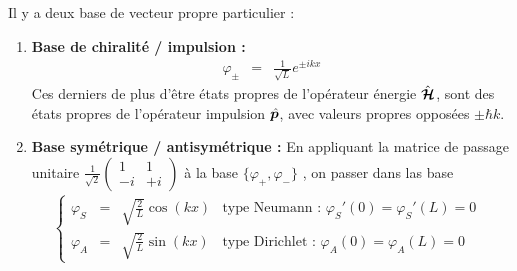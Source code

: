 \medskip
Il y a deux base de vecteur propre particulier : 
\begin{enumerate}[label=\roman*)]
	\item {\bf Base de chiralité / impulsion :}
	\begin{eqnarray}\label{chap.1.rapel.libre.7}
		\varphi_\pm  & = & \displaystyle \frac{1}{\sqrt{L}} e^{\pm ikx} 
	\end{eqnarray}
	Ces derniers de plus d'être états propres de l’opérateur énergie $\hat{\bm{\mathcal{H}}}$, sont des états propres de l’opérateur impulsion $\hat{\bm{p}}$, avec valeurs propres opposées $\pm \hbar k$.
	\item {\bf Base symétrique / antisymétrique :} En appliquant la matrice de passage unitaire  $\frac{1}{\sqrt{2}}\left (\begin{matrix}1 & 1 \\ -i & + i\end{matrix}\right)$ à la base $\{ \varphi_+ , \varphi_- \}$ , on passer dans las base    
	\begin{eqnarray}\label{chap.1.rapel.libre.8}
		\left \{ \begin{array}{rcllll} \varphi_S  & = & \displaystyle \sqrt{\frac{2}{L}} \cos (kx)  & \mbox{type Neumann  : $\varphi_S'(0) = \varphi_S'(L) = 0 $ } \\ \varphi_A   & = & \displaystyle \sqrt{\frac{2}{L}} \sin (kx)  & \mbox{type Dirichlet : $\varphi_A(0) = \varphi_A(L) = 0 $}\end{array} \right.
	\end{eqnarray}
\end{enumerate}


